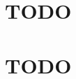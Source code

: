 \documentclass[a5paper,DIV=12,BCOR=9mm,headsepline,headings=small,cleardoubleempty,10pt]{scrbook}
\begin{document}
\ifusinght
\else
  
\fi
\frontmatter



\tableofcontents
\mainmatter
\part{TODO}

\part{TODO}


\backmatter
\end{document}
